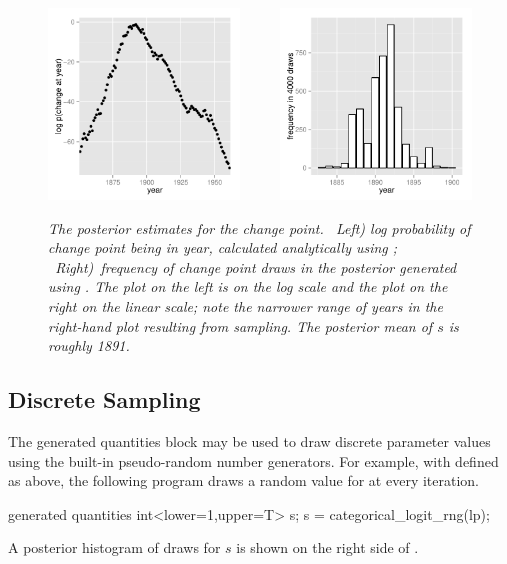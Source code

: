 \begin{figure}
\begin{center}
\includegraphics[height=2in]{img/change-point-posterior.pdf}
\ \ \ \ \
\includegraphics[height=2in]{img/s-discrete-posterior.pdf}
\end{center}
\vspace*{-12pt}
\caption{\small\it The posterior estimates for the change point.  \
  {\rm Left)} log probability of change point being in year,
  calculated analytically using ; \ {\rm Right)}\ frequency
  of change point draws in the posterior generated using
  \code{lp}. The plot on the left is on the log scale and the plot on
  the right on the linear scale; note the narrower range of years in
  the right-hand plot resulting from sampling. The posterior mean of
  $s$ is roughly 1891.}%
\label{change-point-posterior.figure}
\end{figure}
%



\subsection{Discrete Sampling}

The generated quantities block may be used to draw discrete parameter
values using the built-in pseudo-random number generators.  For
example, with \code{lp} defined as above, the following program
draws a random value for \code{s} at every iteration.
%
\begin{stancode}
generated quantities {
  int<lower=1,upper=T> s;
  s = categorical_logit_rng(lp);
}
\end{stancode}
%
A posterior histogram of draws for $s$ is shown on the right side of
.

